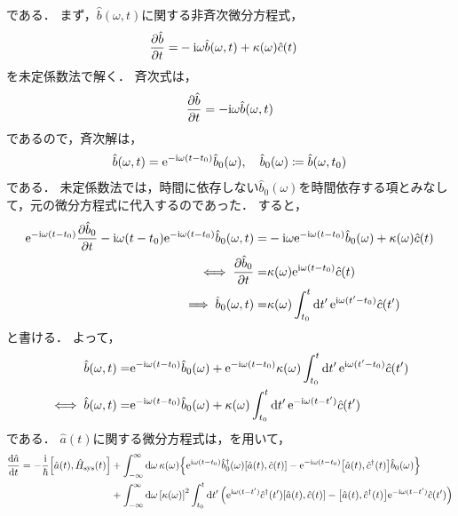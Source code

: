 \documentclass{report}
\begin{document}
      である．
      まず，$\hat{b}(\omega, t)$に関する非斉次微分方程式，
      \begin{align}
        \pdv{\hat{b}}{t}(\omega, t) =& -\mathrm{i}\omega\hat{b}(\omega, t) + \kappa(\omega)\hat{c}(t)
      \end{align}
      を未定係数法で解く．
      斉次式は，
      \begin{align}
        \pdv{\hat{b}}{t}(\omega, t) = -\mathrm{i}\omega\hat{b}(\omega, t)
      \end{align}
      であるので，斉次解は，
      \begin{align}
        \hat{b}(\omega, t) = \mathrm{e}^{-\mathrm{i}\omega(t - t_0)}\hat{b}_0(\omega),\quad \hat{b}_0(\omega) \coloneqq \hat{b}(\omega, t_0)
      \end{align}
      である．
      未定係数法では，時間に依存しない$\hat{b}_0(\omega)$を時間依存する項とみなして，元の微分方程式に代入するのであった．
      すると，
      \begin{align}
        \mathrm{e}^{-\mathrm{i}\omega(t - t_0)}\pdv{\hat{b}_0}{t} (\omega, t) - \mathrm{i}\omega(t - t_0)\mathrm{e}^{-\mathrm{i}\omega(t - t_0)}\hat{b}_0(\omega, t) =& -\mathrm{i}\omega\mathrm{e}^{-\mathrm{i}\omega(t - t_0)}\hat{b}_0(\omega) + \kappa(\omega)\hat{c}(t) \\ 
        \iff \pdv{\hat{b}_0}{t} (\omega, t) =& \kappa(\omega)\mathrm{e}^{\mathrm{i}\omega(t - t_0)}\hat{c}(t) \\ 
        \implies \hat{b}_0(\omega, t) =& \kappa(\omega)\int_{t_0}^{t}\dd{t'}\mathrm{e}^{\mathrm{i}\omega(t' - t_0)}\hat{c}(t')
      \end{align}
      と書ける．
      よって，
      \begin{align}
        \hat{b}(\omega, t) =& \mathrm{e}^{-\mathrm{i}\omega(t - t_0)}\hat{b}_0(\omega) + \mathrm{e}^{-\mathrm{i}\omega(t - t_0)}\kappa(\omega)\int_{t_0}^{t}\dd{t'}\mathrm{e}^{\mathrm{i}\omega(t' - t_0)}\hat{c}(t') \\ 
        \iff \hat{b}(\omega, t) =& \mathrm{e}^{-\mathrm{i}\omega(t - t_0)}\hat{b}_0(\omega) + \kappa(\omega)\int_{t_0}^{t}\dd{t'}\mathrm{e}^{-\mathrm{i}\omega(t - t')}\hat{c}(t') \label{PhysRevA.31.3761-b-simple-representation}
      \end{align}
      である．
      $\hat{a}(t)$に関する微分方程式は，を用いて，
      \begin{align}
        \dv{\hat{a}}{t}(t) = -\frac{\mathrm{i}}{\hbar}\qty[\hat{a}(t), \hat{H}_{\mathrm{sys}}(t)] &+ \int_{-\infty}^{\infty}\dd{\omega}\kappa(\omega)\qty{\mathrm{e}^{\mathrm{i}\omega(t - t_0)}\hat{b}^{\dag}_0(\omega)\qty[\hat{a}(t), \hat{c}(t)] - \mathrm{e}^{-\mathrm{i}\omega(t - t_0)}\qty[\hat{a}(t), \hat{c}^{\dag}(t)]\hat{b}_0(\omega)} \\ 
        &+ \int_{-\infty}^{\infty}\dd{\omega}\qty[\kappa(\omega)]^2\int_{t_0}^{t}\dd{t'}\qty(\mathrm{e}^{\mathrm{i}\omega(t - t')}\hat{c}^{\dag}(t')\qty[\hat{a}(t), \hat{c}(t)] - \qty[\hat{a}(t), \hat{c}^{\dag}(t)]\mathrm{e}^{-\mathrm{i}\omega(t - t')}\hat{c}(t')) \label{PhysRevA.31.3761-a-pdv}
      \end{align}
\end{document}
